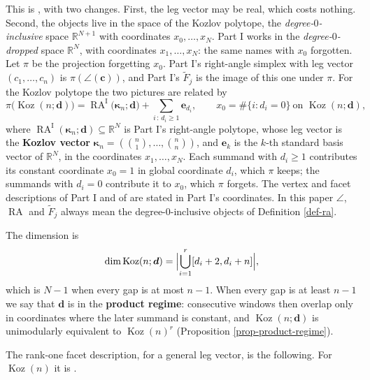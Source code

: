 \documentclass[11pt, a4paper, abstract=yes]{scrartcl}
\theoremstyle{definition}
\theoremstyle{remark}
\theoremstyle{plain}
\newcommand{\vek}[1]{\boldsymbol{#1}}
\theoremstyle{remark}
\theoremstyle{plain}
\newcommand{\Koz}{\operatorname{Koz}}
\newcommand{\rasimp}{\angle}
\newcommand{\RA}{\operatorname{RA}}
\newcommand{\kozvec}{\vek\kappa}
\let\autocite\cite
\begin{document}
This is \autocite[Definition 36]{SnellmanArticle1}, with two changes. First, the leg vector may be
real, which costs nothing. Second, the objects live in the space of the Kozlov polytope, the
\emph{degree-\(0\)-inclusive} space \(\mathbb R^{N+1}\) with coordinates \(x_0,\dots,x_N\). Part I works in
the \emph{degree-\(0\)-dropped} space \(\mathbb R^N\), with coordinates \(x_1,\dots,x_N\): the same names
with \(x_0\) forgotten. Let \(\pi\) be the projection forgetting \(x_0\). Part I's right-angle simplex
with leg vector \((c_1,\dots,c_n)\) is \(\pi(\rasimp(\vek c))\), and Part I's \(\tilde F_j\) is the
image of this one under \(\pi\). For the Kozlov polytope the two pictures are related by
\autocite[Section 8]{SnellmanArticle1}
\begin{equation}\label{eq:koz-as-ra}
  \pi\bigl(\Koz(n;\vek d)\bigr)=\RA^{\mathrm I}\bigl(\kozvec_n;\vek d\bigr)+\sum_{i\,:\,d_i\ge1}\vek e_{d_i},
  \qquad x_0=\#\lbrace i:d_i=0\rbrace\ \text{on }\Koz(n;\vek d),
\end{equation}
where \(\RA^{\mathrm I}(\kozvec_n;\vek d)\subseteq\mathbb R^N\) is Part I's right-angle polytope, whose
leg vector is the \textbf{Kozlov vector} \(\kozvec_n=(\binom n1,\dots,\binom nn)\), and \(\vek e_k\) is the
\(k\)-th standard basis vector of \(\mathbb R^N\), in the coordinates \(x_1,\dots,x_N\). Each summand
with \(d_i\ge1\) contributes its constant coordinate \(x_0=1\) in global coordinate \(d_i\), which
\(\pi\) keeps; the summands with \(d_i=0\) contribute it to \(x_0\), which \(\pi\) forgets. The vertex
and facet descriptions of Part I and of \autocite{SnellmanArticle4} are stated in Part I's coordinates.
In this paper \(\rasimp\), \(\RA\) and \(\tilde F_j\) always mean the degree-\(0\)-inclusive objects of
Definition \ref{def-ra}.

The dimension is \autocite[Proposition 45]{SnellmanArticle1}
\begin{equation}\label{eq:dim}
  \dim\Koz(n;\vek d)=\Bigl\lvert\bigcup_{i=1}^r[d_i+2,d_i+n]\Bigr\rvert ,
\end{equation}
which is \(N-1\) when every gap is at most \(n-1\). When
every gap is at least \(n-1\) we say that \(\vek d\) is in the \textbf{product regime}: consecutive windows
then overlap only in coordinates where the later summand is constant, and \(\Koz(n;\vek d)\) is
unimodularly equivalent to \(\Koz(n)^r\) (Proposition \ref{prop-product-regime}).

The rank-one facet description, for a general leg vector, is the following. For
\(\Koz(n)\) it is \autocite[Lemma 13 and Corollary 16]{SnellmanArticle1}.
\end{document}
